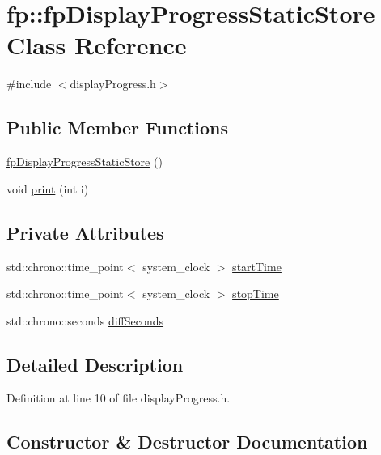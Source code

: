 \hypertarget{classfp_1_1fpDisplayProgressStaticStore}{}\section{fp\+:\+:fp\+Display\+Progress\+Static\+Store Class Reference}
\label{classfp_1_1fpDisplayProgressStaticStore}


{\ttfamily \#include $<$display\+Progress.\+h$>$}

\subsection*{Public Member Functions}
\begin{DoxyCompactItemize}
\item 
\hyperlink{classfp_1_1fpDisplayProgressStaticStore_a31330f7f864dff5ba94f5c59439b016f}{fp\+Display\+Progress\+Static\+Store} ()
\item 
void \hyperlink{classfp_1_1fpDisplayProgressStaticStore_a9b2ab53929032183e681157515cf5313}{print} (int i)
\end{DoxyCompactItemize}
\subsection*{Private Attributes}
\begin{DoxyCompactItemize}
\item 
std\+::chrono\+::time\+\_\+point$<$ system\+\_\+clock $>$ \hyperlink{classfp_1_1fpDisplayProgressStaticStore_aa602428554cc8543ec40617ffacd531d}{start\+Time}
\item 
std\+::chrono\+::time\+\_\+point$<$ system\+\_\+clock $>$ \hyperlink{classfp_1_1fpDisplayProgressStaticStore_a7af621498c605e7955b9f1bb2abdb5a4}{stop\+Time}
\item 
std\+::chrono\+::seconds \hyperlink{classfp_1_1fpDisplayProgressStaticStore_a9765e1784e83522a0b842d342e479816}{diff\+Seconds}
\end{DoxyCompactItemize}


\subsection{Detailed Description}


Definition at line 10 of file display\+Progress.\+h.



\subsection{Constructor \& Destructor Documentation}
\mbox{\label{classfp_1_1fpDisplayProgressStaticStore_a31330f7f864dff5ba94f5c59439b016f}} 
